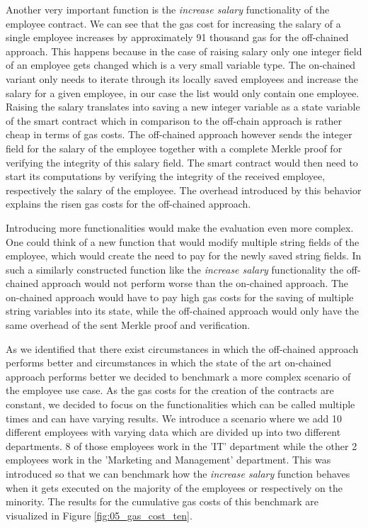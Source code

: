 Another very important function is the \textit{increase salary} functionality of the employee contract.
We can see that the gas cost for increasing the salary of a single employee increases by approximately 91 thousand gas for the off-chained approach.
This happens because in the case of raising salary only one integer field of an employee gets changed which is a very small variable type.
The on-chained variant only needs to iterate through its locally saved employees and increase the salary for a given employee, in our case the list would only contain one employee.
Raising the salary translates into saving a new integer variable as a state variable of the smart contract which in comparison to the off-chain approach is rather cheap in terms of gas costs.
The off-chained approach however sends the integer field for the salary of the employee together with a complete Merkle proof for verifying the integrity of this salary field.
The smart contract would then need to start its computations by verifying the integrity of the received employee, respectively the salary of the employee.
The overhead introduced by this behavior explains the risen gas costs for the off-chained approach.

Introducing more functionalities would make the evaluation even more complex.
One could think of a new function that would modify multiple string fields of the employee, which would create the need to pay for the newly saved string fields.
In such a similarly constructed function like the \textit{increase salary} functionality the off-chained approach would not perform worse than the on-chained approach.
The on-chained approach would have to pay high gas costs for the saving of multiple string variables into its state, while the off-chained approach would only have the same overhead of the sent Merkle proof and verification.

As we identified that there exist circumstances in which the off-chained approach performs better and circumstances in which the state of the art on-chained approach performs better we decided to benchmark a more complex scenario of the employee use case.
As the gas costs for the creation of the contracts are constant, we decided to focus on the functionalities which can be called multiple times and can have varying results.
We introduce a scenario where we add 10 different employees with varying data which are divided up into two different departments.
8 of those employees work in the 'IT' department while the other 2 employees work in the 'Marketing and Management' department.
This was introduced so that we can benchmark how the \textit{increase salary} function behaves when it gets executed on the majority of the employees or respectively on the minority.
The results for the cumulative gas costs of this benchmark are visualized in Figure \ref{fig:05_gas_cost_ten}.

